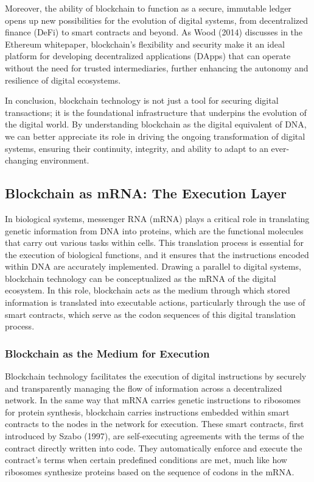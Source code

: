 \documentclass[12pt,twoside]{article}
\begin{document}
Moreover, the ability of blockchain to function as a secure, immutable ledger opens up new possibilities for the evolution of digital systems, from decentralized finance (DeFi) to smart contracts and beyond. As Wood (2014) discusses in the Ethereum whitepaper, blockchain’s flexibility and security make it an ideal platform for developing decentralized applications (DApps) that can operate without the need for trusted intermediaries, further enhancing the autonomy and resilience of digital ecosystems.

In conclusion, blockchain technology is not just a tool for securing digital transactions; it is the foundational infrastructure that underpins the evolution of the digital world. By understanding blockchain as the digital equivalent of DNA, we can better appreciate its role in driving the ongoing transformation of digital systems, ensuring their continuity, integrity, and ability to adapt to an ever-changing environment.


\subsection{Blockchain as mRNA: The Execution Layer}

In biological systems, messenger RNA (mRNA) plays a critical role in translating genetic information from DNA into proteins, which are the functional molecules that carry out various tasks within cells. This translation process is essential for the execution of biological functions, and it ensures that the instructions encoded within DNA are accurately implemented. Drawing a parallel to digital systems, blockchain technology can be conceptualized as the mRNA of the digital ecosystem. In this role, blockchain acts as the medium through which stored information is translated into executable actions, particularly through the use of smart contracts, which serve as the codon sequences of this digital translation process.

\subsubsection{Blockchain as the Medium for Execution}

Blockchain technology facilitates the execution of digital instructions by securely and transparently managing the flow of information across a decentralized network. In the same way that mRNA carries genetic instructions to ribosomes for protein synthesis, blockchain carries instructions embedded within smart contracts to the nodes in the network for execution. These smart contracts, first introduced by Szabo (1997), are self-executing agreements with the terms of the contract directly written into code. They automatically enforce and execute the contract’s terms when certain predefined conditions are met, much like how ribosomes synthesize proteins based on the sequence of codons in the mRNA.
\end{document}
